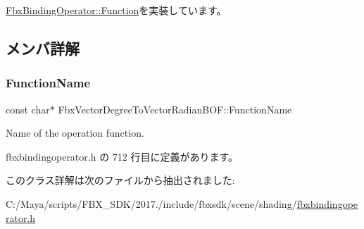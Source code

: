 \hyperlink{class_fbx_binding_operator_1_1_function_a9bbeec993a6e453a6569e7f40a85fd52}{Fbx\+Binding\+Operator\+::\+Function}を実装しています。



\subsection{メンバ詳解}
\mbox{\label{class_fbx_vector_degree_to_vector_radian_b_o_f_a69dbcc81c0c6b15cd9906886b3266481}} 
\subsubsection{\texorpdfstring{Function\+Name}{FunctionName}}
{\footnotesize\ttfamily const char$\ast$ Fbx\+Vector\+Degree\+To\+Vector\+Radian\+B\+O\+F\+::\+Function\+Name\hspace{0.3cm}{\ttfamily [static]}}



Name of the operation function. 



 fbxbindingoperator.\+h の 712 行目に定義があります。



このクラス詳解は次のファイルから抽出されました\+:\begin{DoxyCompactItemize}
\item 
C\+:/\+Maya/scripts/\+F\+B\+X\+\_\+\+S\+D\+K/2017./include/fbxsdk/scene/shading/\hyperlink{fbxbindingoperator_8h}{fbxbindingoperator.\+h}\end{DoxyCompactItemize}
